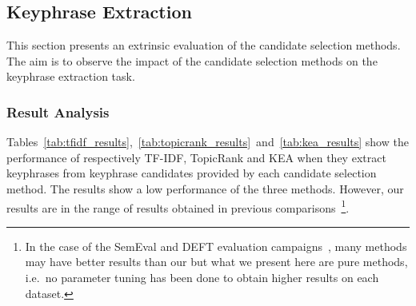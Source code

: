 

  \subsection{Keyphrase Extraction}
  \label{subsec:keyphrase_extraction}
    This section presents an extrinsic evaluation of the candidate selection
    methods. The aim is to observe the impact of the candidate selection
    methods on the keyphrase extraction task.

    \subsubsection{Result Analysis}
    \label{subsubsec:candidate_extraction_result_analysis}
      Tables~\ref{tab:tfidf_results},~\ref{tab:topicrank_results}~and~\ref{tab:kea_results}
      show the performance of respectively TF-IDF, TopicRank and KEA when
      they extract keyphrases from keyphrase candidates provided by each
      candidate selection method. The results show a low performance of the
      three methods. However, our results are in the range of results obtained
      in previous
      comparisons~\cite{hassan2010conundrums,kim2010semeval,paroubek2012deft}\footnote{In
      the case of the SemEval and DEFT evaluation
      campaigns~\cite{kim2010semeval,paroubek2012deft}, many methods may have
      better results than our but what we present here are pure methods,
      i.e.~no parameter tuning has been done to obtain higher results on each
      dataset.}.
